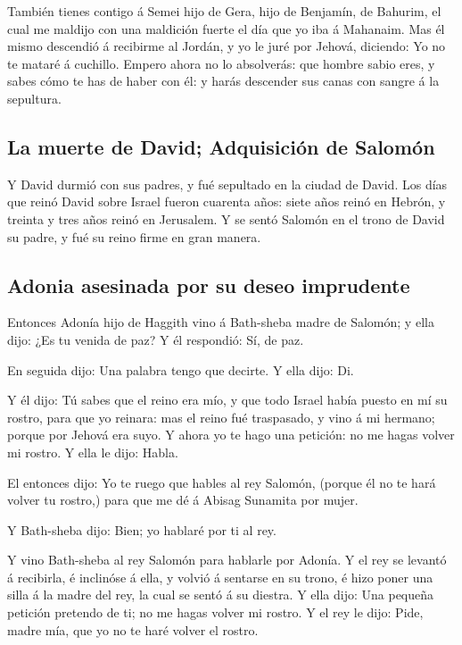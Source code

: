  También tienes contigo á Semei hijo de Gera, hijo de
Benjamín, de Bahurim, el cual me maldijo con una maldición fuerte el día
que yo iba á Mahanaim. Mas él mismo descendió á recibirme al Jordán, y
yo le juré por Jehová, diciendo: Yo no te mataré á cuchillo.
 Empero ahora no lo absolverás: que hombre sabio eres, y
sabes cómo te has de haber con él: y harás descender sus canas con
sangre á la sepultura.

\hypertarget{la-muerte-de-david-adquisiciuxf3n-de-salomuxf3n}{%
\subsection{La muerte de David; Adquisición de
Salomón}\label{la-muerte-de-david-adquisiciuxf3n-de-salomuxf3n}}

 Y David durmió con sus padres, y fué sepultado en la
ciudad de David.  Los días que reinó David sobre Israel
fueron cuarenta años: siete años reinó en Hebrón, y treinta y tres años
reinó en Jerusalem.  Y se sentó Salomón en el trono de
David su padre, y fué su reino firme en gran manera.

\hypertarget{adonia-asesinada-por-su-deseo-imprudente}{%
\subsection{Adonia asesinada por su deseo
imprudente}\label{adonia-asesinada-por-su-deseo-imprudente}}

 Entonces Adonía hijo de Haggith vino á Bath-sheba madre
de Salomón; y ella dijo: ¿Es tu venida de paz? Y él respondió: Sí, de
paz.

 En seguida dijo: Una palabra tengo que decirte. Y ella
dijo: Di.

 Y él dijo: Tú sabes que el reino era mío, y que todo
Israel había puesto en mí su rostro, para que yo reinara: mas el reino
fué traspasado, y vino á mi hermano; porque por Jehová era suyo.
 Y ahora yo te hago una petición: no me hagas volver mi
rostro. Y ella le dijo: Habla.

 El entonces dijo: Yo te ruego que hables al rey Salomón,
(porque él no te hará volver tu rostro,) para que me dé á Abisag
Sunamita por mujer.

 Y Bath-sheba dijo: Bien; yo hablaré por ti al rey.

 Y vino Bath-sheba al rey Salomón para hablarle por
Adonía. Y el rey se levantó á recibirla, é inclinóse á ella, y volvió á
sentarse en su trono, é hizo poner una silla á la madre del rey, la cual
se sentó á su diestra.  Y ella dijo: Una pequeña petición
pretendo de ti; no me hagas volver mi rostro. Y el rey le dijo: Pide,
madre mía, que yo no te haré volver el rostro.

